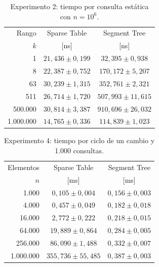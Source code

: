 \begin{table}[!ht]
    \centering
    \caption{Experimento 2: tiempo por consulta estática con \(n=10^6\).}
    \label{tab:res-consultas-estaticas}
    \begin{tabular}{@{}rcc@{}}
        \toprule
        Rango & Sparse Table & Segment Tree \\
        \(k\) & [ns] & [ns] \\
        \midrule
        1 & \(21{,}436 \pm 0{,}199\) & \(32{,}395 \pm 0{,}938\) \\
        8 & \(22{,}387 \pm 0{,}752\) & \(170{,}172 \pm 5{,}207\) \\
        63 & \(30{,}239 \pm 1{,}315\) & \(352{,}761 \pm 2{,}321\) \\
        511 & \(26{,}714 \pm 1{,}720\) & \(507{,}993 \pm 11{,}615\) \\
        500.000 & \(30{,}814 \pm 3{,}387\) & \(910{,}696 \pm 26{,}032\) \\
        1.000.000 & \(14{,}765 \pm 0{,}336\) & \(114{,}839 \pm 1{,}023\) \\
        \bottomrule
    \end{tabular}
\end{table}

\begin{table}[!ht]
    \centering
    \caption{Experimento 4: tiempo por ciclo de un cambio y 1.000 consultas.}
    \label{tab:res-ciclo-dinamico}
    \begin{tabular}{@{}rcc@{}}
        \toprule
        Elementos & Sparse Table & Segment Tree \\
        \(n\) & [ms] & [ms] \\
        \midrule
        1.000 & \(0{,}105 \pm 0{,}004\) & \(0{,}156 \pm 0{,}003\) \\
        4.000 & \(0{,}457 \pm 0{,}049\) & \(0{,}182 \pm 0{,}018\) \\
        16.000 & \(2{,}772 \pm 0{,}222\) & \(0{,}218 \pm 0{,}015\) \\
        64.000 & \(19{,}889 \pm 0{,}864\) & \(0{,}284 \pm 0{,}005\) \\
        256.000 & \(86{,}090 \pm 1{,}488\) & \(0{,}332 \pm 0{,}007\) \\
        1.000.000 & \(355{,}736 \pm 55{,}485\) & \(0{,}387 \pm 0{,}003\) \\
        \bottomrule
    \end{tabular}
\end{table}

